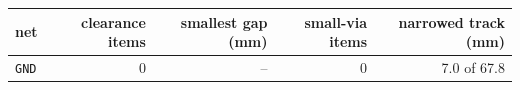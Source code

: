 \begin{tabular}{lrrrr}
\toprule
net & clearance items & smallest gap (mm) & small-via items & narrowed track (mm) \\
\midrule
\texttt{GND} & 0 & -- & 0 & 7.0 of 67.8 \\
\bottomrule
\end{tabular}
